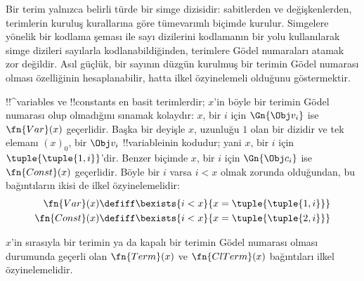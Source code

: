 


\begin{explain}
Bir terim yalnızca belirli türde bir simge dizisidir: sabitlerden ve
değişkenlerden, terimlerin kuruluş kurallarına göre tümevarımlı biçimde
kurulur. Simgelere yönelik bir kodlama şeması ile sayı dizilerini kodlamanın
bir yolu kullanılarak simge dizileri sayılarla kodlanabildiğinden, terimlere
Gödel numaraları atamak zor değildir. Asıl güçlük, bir sayının düzgün
kurulmuş bir terimin Gödel numarası olması özelliğinin hesaplanabilir, hatta
ilkel özyinelemeli olduğunu göstermektir.
\end{explain}

!!^{variable}s ve !!{constant}s en basit terimlerdir; $x$'in böyle bir
terimin Gödel numarası olup olmadığını sınamak kolaydır: $x$, bir $i$ için
$\Gn{\Obj v_i}$ ise $\fn{Var}(x)$ geçerlidir. Başka bir deyişle $x$,
uzunluğu $1$ olan bir dizidir ve tek elemanı $(x)_0$, bir $\Obj v_i$
!!{variable}{}inin kodudur; yani $x$, bir $i$ için
$\tuple{\tuple{1, i}}$'dir. Benzer biçimde $x$, bir $i$ için
$\Gn{\Obj c_i}$ ise $\fn{Const}(x)$ geçerlidir. Böyle bir $i$ varsa
$i<x$ olmak zorunda olduğundan, bu bağıntıların ikisi de ilkel
özyinelemelidir:
\begin{align*}
  \fn{Var}(x) & \defiff \bexists{i<x}{x = \tuple{\tuple{1, i}}}\\
  \fn{Const}(x) & \defiff \bexists{i<x}{x = \tuple{\tuple{2, i}}}
\end{align*}

\begin{prop}
$x$'in sırasıyla bir terimin ya da kapalı bir terimin Gödel numarası olması
durumunda geçerli olan $\fn{Term}(x)$ ve $\fn{ClTerm}(x)$ bağıntıları ilkel
özyinelemelidir.
\end{prop}

